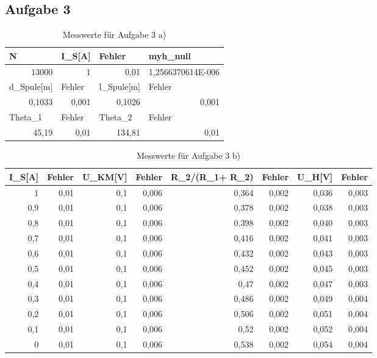 \documentclass[12pt]{scrartcl}
\begin{document}
\subsection{Aufgabe 3}
\begin{table}[htbp]
\caption{Messwerte für Aufgabe 3 a)}
\begin{center}
\begin{tabular}{|l|l|l|l|}
\hline
N & I\_S[A] & Fehler & myh\_null \\ \hline
\multicolumn{1}{|r|}{13000} & \multicolumn{1}{r|}{1} & \multicolumn{1}{r|}{0,01} & \multicolumn{1}{r|}{1,2566370614E-006} \\ \hline
d\_Spule[m] & Fehler & l\_Spule[m] & Fehler \\ \hline
\multicolumn{1}{|r|}{0,1033} & \multicolumn{1}{r|}{0,001} & \multicolumn{1}{r|}{0,1026} & \multicolumn{1}{r|}{0,001} \\ \hline
Theta\_1  & Fehler & Theta\_2 & Fehler \\ \hline
\multicolumn{1}{|r|}{45,19} & \multicolumn{1}{r|}{0,01} & \multicolumn{1}{r|}{134,81} & \multicolumn{1}{r|}{0,01} \\ \hline
\end{tabular}
\end{center}
\label{aufgabe_3_a}
\end{table}

\begin{table}[htbp]
\caption{Messwerte für Aufgabe 3 b)}
\begin{center}
\begin{tabular}{|r|r|r|r|r|r|r|r|}
\hline
\multicolumn{1}{|l|}{I\_S[A]} & \multicolumn{1}{l|}{Fehler} & \multicolumn{1}{l|}{U\_KM[V]} & \multicolumn{1}{l|}{Fehler} & \multicolumn{1}{l|}{R\_2/(R\_1+ R\_2)} & \multicolumn{1}{l|}{Fehler} & \multicolumn{1}{l|}{U\_H[V]} & \multicolumn{1}{l|}{Fehler} \\ \hline
1 & 0,01 & 0,1 & 0,006 & 0,364 & 0,002 & 0,036 & 0,003 \\ \hline
0,9 & 0,01 & 0,1 & 0,006 & 0,378 & 0,002 & 0,038 & 0,003 \\ \hline
0,8 & 0,01 & 0,1 & 0,006 & 0,398 & 0,002 & 0,040 & 0,003 \\ \hline
0,7 & 0,01 & 0,1 & 0,006 & 0,416 & 0,002 & 0,041 & 0,003 \\ \hline
0,6 & 0,01 & 0,1 & 0,006 & 0,432 & 0,002 & 0,043 & 0,003 \\ \hline
0,5 & 0,01 & 0,1 & 0,006 & 0,452 & 0,002 & 0,045 & 0,003 \\ \hline
0,4 & 0,01 & 0,1 & 0,006 & 0,47 & 0,002 & 0,047 & 0,003 \\ \hline
0,3 & 0,01 & 0,1 & 0,006 & 0,486 & 0,002 & 0,049 & 0,004 \\ \hline
0,2 & 0,01 & 0,1 & 0,006 & 0,506 & 0,002 & 0,051 & 0,004 \\ \hline
0,1 & 0,01 & 0,1 & 0,006 & 0,52 & 0,002 & 0,052 & 0,004 \\ \hline
0 & 0,01 & 0,1 & 0,006 & 0,538 & 0,002 & 0,054 & 0,004 \\ \hline
\end{tabular}
\end{center}
\label{aufgabe_3_b}
\end{table}
\end{document}
